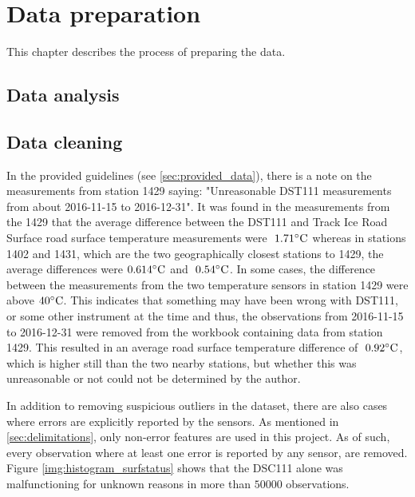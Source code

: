 \chapter{Data preparation}
This chapter describes the process of preparing the data.

\section{Data analysis}

\section{Data cleaning}
	 In the provided guidelines (see \ref{sec:provided_data}), there is a note on the measurements from station 1429 saying: "Unreasonable DST111 measurements from about 2016-11-15 to 2016-12-31". It was found in the measurements from the 1429 that the average difference between the DST111 and Track Ice Road Surface road surface temperature measurements were $~1.71 \celsius$ whereas in stations 1402 and 1431, which are the two geographically closest stations to 1429, the average differences were $0.614 \celsius$ and  $~0.54 \celsius$. In some cases, the difference between the measurements from the two temperature sensors in station 1429 were above $40 \celsius$. This indicates that something may have been wrong with DST111, or some other instrument at the time and thus, the observations from 2016-11-15 to 2016-12-31 were removed from the workbook containing data from station 1429. This resulted in an average road surface temperature difference of $~0.92 \celsius$, which is higher still than the two nearby stations, but whether this was unreasonable or not could not be determined by the author. 

	In addition to removing suspicious outliers in the dataset, there are also cases where errors are explicitly reported by the sensors. As mentioned in \ref{sec:delimitations}, only non-error features are used in this project. As of such, every observation where at least one error is reported by any sensor, are removed. Figure \ref{img:histogram_surfstatus} shows that the DSC111 alone was malfunctioning for unknown reasons in more than $50 000$ observations. 

